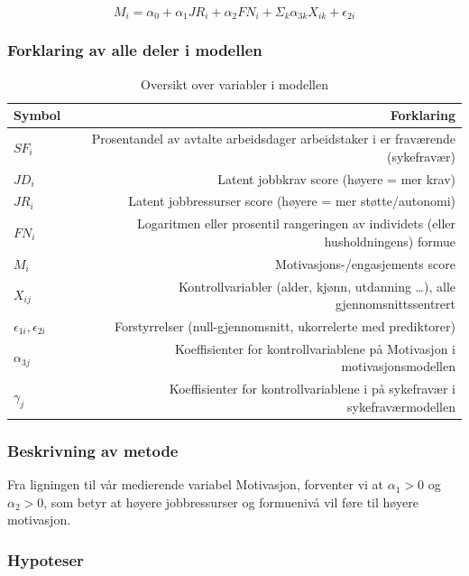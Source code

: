 \documentclass[
  12pt,
  a4paper,
  DIV=11,
  numbers=noendperiod]{scrartcl}
\begin{document}
\[
M_i = \alpha_0 + \alpha_1 JR_i + \alpha_2 FN_i + \Sigma_k \alpha_{3k}X_{ik} + \epsilon_{2i}
\]

\subsubsection{Forklaring av alle deler i
modellen}\label{forklaring-av-alle-deler-i-modellen}

\begin{table}[H]
\centering
\begin{tabular}{lr}
\toprule
Symbol & Forklaring \\ 
\midrule
$SF_i$ & Prosentandel av avtalte arbeidsdager arbeidstaker i er fraværende (sykefravær) \\
$JD_i$ & Latent jobbkrav score (høyere = mer krav) \\
$JR_i$ & Latent jobbressurser score (høyere = mer støtte/autonomi) \\
$FN_i$ & Logaritmen eller prosentil rangeringen av individets (eller husholdningens) formue \\
$M_i$ & Motivasjons-/engasjements score \\
$X_{ij}$ & Kontrollvariabler (alder, kjønn, utdanning …), alle gjennomsnittssentrert \\
$\epsilon_{1i}, \epsilon_{2i}$ & Forstyrrelser (null-gjennomsnitt, ukorrelerte med prediktorer) \\  
$\alpha_{3j} $ & Koeffisienter for kontrollvariablene på Motivasjon i motivasjonsmodellen \\
$\gamma_{j} $ & Koeffisienter for kontrollvariablene i på sykefravær i sykefraværmodellen \\
\hline
\end{tabular}
\caption{Oversikt over variabler i modellen}
\label{tab:variabler}
\end{table}

\subsubsection{Beskrivning av metode}\label{beskrivning-av-metode}

Fra ligningen til vår medierende variabel Motivasjon, forventer vi at
\(\alpha_1 > 0\) og \(\alpha_2 > 0\), som betyr at høyere jobbressurser
og formuenivå vil føre til høyere motivasjon.

\subsubsection{Hypoteser}\label{sec-hypot}
\end{document}
